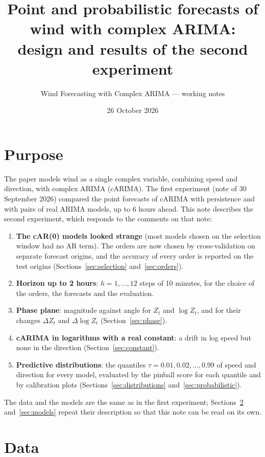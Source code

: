 \documentclass[11pt,a4paper]{article}
\title{Point and probabilistic forecasts of wind with complex ARIMA:\\ design and results of the second experiment}
\author{Wind Forecasting with Complex ARIMA --- working notes}
\date{26 October 2026}
\newcommand{\1}{\mathbf{1}}
\begin{document}
\maketitle

\section{Purpose}

The paper models wind as a single complex variable, combining speed and direction, with complex
ARIMA (cARIMA). The first experiment (note of 30 September 2026) compared the point forecasts of
cARIMA with persistence and with pairs of real ARIMA models, up to 6 hours ahead. This note
describes the second experiment, which responds to the comments on that note:
\begin{enumerate}
  \item \textbf{The cAR(0) models looked strange} (most models chosen on the selection window had
    no AR term). The orders are now chosen by cross-validation on separate forecast origins, and
    the accuracy of every order is reported on the test origins (Sections~\ref{sec:selection}
    and~\ref{sec:orders}).
  \item \textbf{Horizon up to 2 hours}: $h = 1, \dots, 12$ steps of 10 minutes, for the choice of
    the orders, the forecasts and the evaluation.
  \item \textbf{Phase plane}: magnitude against angle for $Z_t$ and $\log Z_t$, and for their
    changes $\Delta Z_t$ and $\Delta\log Z_t$ (Section~\ref{sec:phase}).
  \item \textbf{cARIMA in logarithms with a real constant}: a drift in log speed but none in
    the direction (Section~\ref{sec:constant}).
  \item \textbf{Predictive distributions}: the quantiles $\tau = 0.01, 0.02, \dots, 0.99$ of
    speed and direction for every model, evaluated by the pinball score for each quantile and by
    calibration plots (Sections~\ref{sec:distributions} and~\ref{sec:probabilistic}).
\end{enumerate}
The data and the models are the same as in the first experiment; Sections~\ref{sec:data}
and~\ref{sec:models} repeat their description so that this note can be read on its own.

\section{Data}\label{sec:data}
\end{document}
